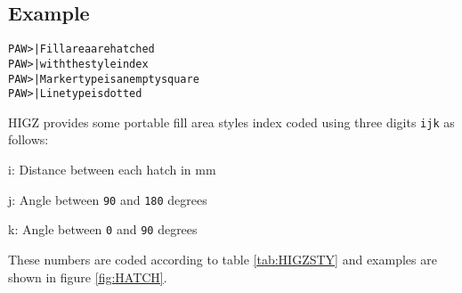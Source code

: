 \subsection*{Example}
\begin{alltt}
PAW >       | Fill area are hatched
PAW >     |   with the style index
PAW >      | Marker type is an empty square
PAW >      | Line type is dotted
\end{alltt}

HIGZ provides some portable fill area styles index coded
using three digits \texttt{ijk} as follows:

\begin{DLtt}{12}
\item[i:] Distance between each hatch in mm
\item[j:] Angle between \texttt{90} and \texttt{180} degrees
\item[k:] Angle between \texttt{0} and \texttt{90} degrees
\end{DLtt}

These numbers are coded according to table \ref{tab:HIGZSTY}
and examples are shown in figure \ref{fig:HATCH}.

